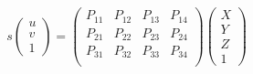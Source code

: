 \documentclass[11pt,a4j]{jsarticle}
\begin{document}
    \begin{equation}
        s\left(
        \begin{array}{c}
            u \\
            v \\
            1
        \end{array}
        \right) =
        \left(
    \begin{array}{cccc}
      P_{11} & P_{12} & P_{13} & P_{14}\\
      P_{21} & P_{22} & P_{23} & P_{24} \\
      P_{31} & P_{32} & P_{33} & P_{34} \\
    \end{array}
        \right)
        \left(
        \begin{array}{c}
            X \\
            Y \\
            Z \\
            1
        \end{array}
        \right)
        \label{eq:projection_matrix}
    \end{equation}
\end{document}
